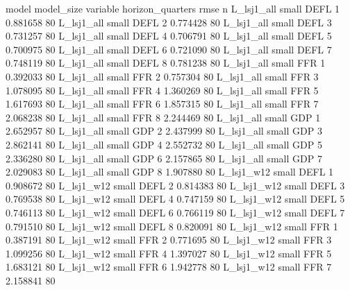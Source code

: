          model model_size variable  horizon_quarters     rmse  n
    L_lsj1_all      small     DEFL                 1 0.881658 80
    L_lsj1_all      small     DEFL                 2 0.774428 80
    L_lsj1_all      small     DEFL                 3 0.731257 80
    L_lsj1_all      small     DEFL                 4 0.706791 80
    L_lsj1_all      small     DEFL                 5 0.700975 80
    L_lsj1_all      small     DEFL                 6 0.721090 80
    L_lsj1_all      small     DEFL                 7 0.748119 80
    L_lsj1_all      small     DEFL                 8 0.781238 80
    L_lsj1_all      small      FFR                 1 0.392033 80
    L_lsj1_all      small      FFR                 2 0.757304 80
    L_lsj1_all      small      FFR                 3 1.078095 80
    L_lsj1_all      small      FFR                 4 1.360269 80
    L_lsj1_all      small      FFR                 5 1.617693 80
    L_lsj1_all      small      FFR                 6 1.857315 80
    L_lsj1_all      small      FFR                 7 2.068238 80
    L_lsj1_all      small      FFR                 8 2.244469 80
    L_lsj1_all      small      GDP                 1 2.652957 80
    L_lsj1_all      small      GDP                 2 2.437999 80
    L_lsj1_all      small      GDP                 3 2.862141 80
    L_lsj1_all      small      GDP                 4 2.552732 80
    L_lsj1_all      small      GDP                 5 2.336280 80
    L_lsj1_all      small      GDP                 6 2.157865 80
    L_lsj1_all      small      GDP                 7 2.029083 80
    L_lsj1_all      small      GDP                 8 1.907880 80
    L_lsj1_w12      small     DEFL                 1 0.908672 80
    L_lsj1_w12      small     DEFL                 2 0.814383 80
    L_lsj1_w12      small     DEFL                 3 0.769538 80
    L_lsj1_w12      small     DEFL                 4 0.747159 80
    L_lsj1_w12      small     DEFL                 5 0.746113 80
    L_lsj1_w12      small     DEFL                 6 0.766119 80
    L_lsj1_w12      small     DEFL                 7 0.791510 80
    L_lsj1_w12      small     DEFL                 8 0.820091 80
    L_lsj1_w12      small      FFR                 1 0.387191 80
    L_lsj1_w12      small      FFR                 2 0.771695 80
    L_lsj1_w12      small      FFR                 3 1.099256 80
    L_lsj1_w12      small      FFR                 4 1.397027 80
    L_lsj1_w12      small      FFR                 5 1.683121 80
    L_lsj1_w12      small      FFR                 6 1.942778 80
    L_lsj1_w12      small      FFR                 7 2.158841 80
